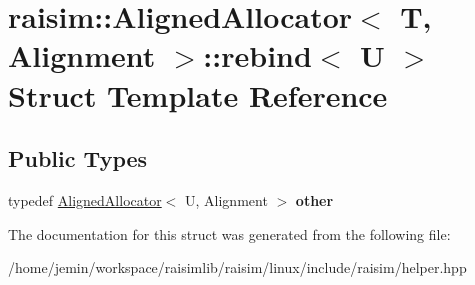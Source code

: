 \hypertarget{structraisim_1_1AlignedAllocator_1_1rebind}{}\section{raisim\+:\+:Aligned\+Allocator$<$ T, Alignment $>$\+:\+:rebind$<$ U $>$ Struct Template Reference}
\label{structraisim_1_1AlignedAllocator_1_1rebind}
\subsection*{Public Types}
\begin{DoxyCompactItemize}
\item 
\mbox{\label{structraisim_1_1AlignedAllocator_1_1rebind_a28255bc4073c4b2ef82bfec5bd8079c1}} 
typedef \hyperlink{classraisim_1_1AlignedAllocator}{Aligned\+Allocator}$<$ U, Alignment $>$ {\bfseries other}
\end{DoxyCompactItemize}


The documentation for this struct was generated from the following file\+:\begin{DoxyCompactItemize}
\item 
/home/jemin/workspace/raisimlib/raisim/linux/include/raisim/helper.\+hpp\end{DoxyCompactItemize}
